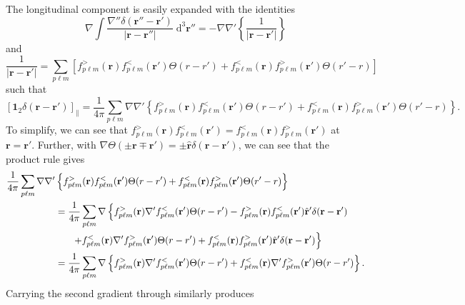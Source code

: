 \documentclass{article}
\numberwithin{equation}{section}
\begin{document}
The longitudinal component is easily expanded with the identities
\begin{equation}
\nabla\int\frac{\nabla''\delta(\mathbf{r}''-\mathbf{r}')}{|\mathbf{r} - \mathbf{r}''|}\;\mathrm{d}^3\mathbf{r}'' = -\nabla\nabla'\left\{\frac{1}{|\mathbf{r} - \mathbf{r}'|}\right\}
\end{equation}
and
\begin{equation}
\frac{1}{|\mathbf{r} - \mathbf{r}'|} = \sum_{p\ell m}\left[f_{p\ell m}^>(\mathbf{r})f_{p\ell m}^<(\mathbf{r}')\Theta(r - r') + f_{p\ell m}^<(\mathbf{r})f_{p\ell m}^>(\mathbf{r}')\Theta(r' - r)\right]
\end{equation}
such that
\begin{equation}
\left[\bm{1}_2\delta(\mathbf{r} - \mathbf{r}')\right]_\parallel = \frac{1}{4\pi}\sum_{p\ell m}\nabla\nabla'\left\{f_{p\ell m}^>(\mathbf{r}) f_{p\ell m}^<(\mathbf{r}')\Theta(r - r') + f_{p\ell m}^<(\mathbf{r})f_{p\ell m}^>(\mathbf{r}')\Theta(r' - r)\right\}.
\end{equation}
To simplify, we can see that $f_{p\ell m}^>(\mathbf{r}) f_{p\ell m}^<(\mathbf{r}') = f_{p\ell m}^<(\mathbf{r})f_{p\ell m}^>(\mathbf{r}')$ at $\mathbf{r} = \mathbf{r}'$. Further, with $\nabla\Theta(\pm\mathbf{r} \mp \mathbf{r}') = \pm\hat{\mathbf{r}}\delta(\mathbf{r} - \mathbf{r}')$, we can see that the product rule gives
\begin{equation}
\begin{split}
\frac{1}{4\pi}\sum_{p\ell m}\nabla\nabla'&\left\{f_{p\ell m}^>(\mathbf{r}) f_{p\ell m}^<(\mathbf{r}')\Theta(r - r') + f_{p\ell m}^<(\mathbf{r})f_{p\ell m}^>(\mathbf{r}')\Theta(r' - r)\right\}\\
&= \frac{1}{4\pi}\sum_{p\ell m}\nabla\left\{f_{p\ell m}^>(\mathbf{r})\nabla'f_{p\ell m}^<(\mathbf{r}')\Theta(r - r') - f_{p\ell m}^>(\mathbf{r})f_{p\ell m}^<(\mathbf{r}')\hat{\mathbf{r}}'\delta(\mathbf{r} - \mathbf{r}')\right.\\
&\hspace{0.05\textwidth}\left.+ f_{p\ell m}^<(\mathbf{r})\nabla'f_{p\ell m}^>(\mathbf{r}')\Theta(r - r') + f_{p\ell m}^<(\mathbf{r})f_{p\ell m}^>(\mathbf{r}')\hat{\mathbf{r}}'\delta(\mathbf{r} - \mathbf{r}')\right\}\\
&= \frac{1}{4\pi}\sum_{p\ell m}\nabla\left\{f_{p\ell m}^>(\mathbf{r})\nabla'f_{p\ell m}^<(\mathbf{r}')\Theta(r - r') + f_{p\ell m}^<(\mathbf{r})\nabla'f_{p\ell m}^>(\mathbf{r}')\Theta(r - r')\right\}.
\end{split}
\end{equation}
Carrying the second gradient through similarly produces
\end{document}
